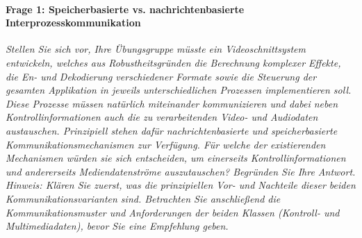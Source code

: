 \documentclass[a4paper]{article}
\begin{document}
\paragraph{Frage 1: Speicherbasierte vs. nachrichtenbasierte Interprozesskommunikation}
\textit{Stellen Sie sich vor, Ihre Übungsgruppe müsste ein Videoschnittsystem entwickeln, welches aus Robustheitsgründen die Berechnung komplexer Effekte, die En- und Dekodierung verschiedener Formate sowie die Steuerung der gesamten Applikation in jeweils unterschiedlichen Prozessen implementieren soll. Diese Prozesse müssen natürlich miteinander kommunizieren und dabei neben Kontrollinformationen auch die zu verarbeitenden Video- und Audiodaten austauschen.
    Prinzipiell stehen dafür nachrichtenbasierte und speicherbasierte Kommunikationsmechanismen zur Verfügung. Für welche der existierenden Mechanismen würden sie sich entscheiden, um einerseits Kontrollinformationen und andererseits Mediendatenströme auszutauschen? Begründen Sie Ihre Antwort.\\
    Hinweis: Klären Sie zuerst, was die prinzipiellen Vor- und Nachteile dieser beiden Kommunikationsvarianten sind. Betrachten Sie anschließend die Kommunikationsmuster und Anforderungen der beiden Klassen (Kontroll- und Multimediadaten), bevor Sie eine Empfehlung geben.
}
\end{document}

